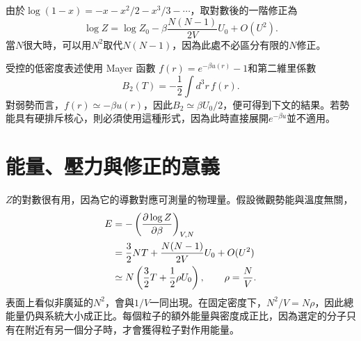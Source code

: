 \begin{classroomqa}
\end{classroomqa}

\begin{classroomqa}
\end{classroomqa}

\begin{classroomqa}
\end{classroomqa}

由於\(\log(1-x)=-x-x^2/2-x^3/3-\cdots\)，取對數後的一階修正為
\begin{equation}
 \log Z
 =
 \log Z_0
 -\beta\frac{N(N-1)}{2V}U_0
 +O(U^2).
 \label{eq:sm6-logz-correction}
\end{equation}
當\(N\)很大時，可以用\(N^2\)取代\(N(N-1)\)，因為此處不必區分有限的\(N\)修正。

\begin{remark}
受控的低密度表述使用 Mayer 函數
\(f(r)=e^{-\beta u(r)}-1\)和第二維里係數
\begin{equation}
 B_2(T)=-\frac{1}{2}\int d^3r\,f(r).
 \label{eq:sm6-second-virial}
\end{equation}
對弱勢而言，\(f(r)\simeq-\beta u(r)\)，因此\(B_2\simeq\beta U_0/2\)，便可得到下文的結果。若勢能具有硬排斥核心，則必須使用這種形式，因為此時直接展開\(e^{-\beta u}\)並不適用。
\end{remark}

\section{能量、壓力與修正的意義}

\(Z\)的對數很有用，因為它的導數對應可測量的物理量。假設微觀勢能與溫度無關，
\begin{align}
 E
 &=-\left(\frac{\partial\log Z}{\partial\beta}\right)_{V,N} \notag\\
 &=
 \frac{3}{2}NT
 +\frac{N(N-1)}{2V}U_0+O(U^2) \notag\\
 &\simeq
 N\left(\frac{3}{2}T+\frac{1}{2}\rho U_0\right),
 \qquad
 \rho=\frac{N}{V}.
 \label{eq:sm6-energy-correction}
\end{align}
表面上看似非廣延的\(N^2\)，會與\(1/V\)一同出現。在固定密度下，\(N^2/V=N\rho\)，因此總能量仍與系統大小成正比。每個粒子的額外能量與密度成正比，因為選定的分子只有在附近有另一個分子時，才會獲得粒子對作用能量。

